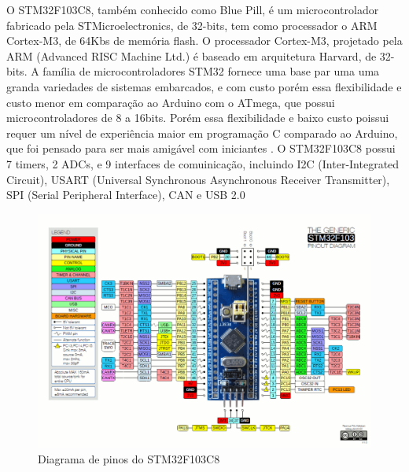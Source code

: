 O STM32F103C8, também conhecido como Blue Pill, é um microcontrolador fabricado pela STMicroelectronics, de 32-bits, tem como processador o ARM Cortex-M3, de 64Kbs de memória flash.
O processador Cortex-M3, projetado pela ARM (Advanced RISC Machine Ltd.) é  baseado em arquitetura Harvard, de 32-bits.
A família de microcontroladores STM32 fornece uma base par uma uma granda variedades de sistemas embarcados,  e com custo porém essa flexibilidade e custo menor em comparação ao Arduino com o ATmega, que possui microcontroladores de 8 a 16bits.
Porém essa flexibilidade e baixo custo poissui requer um nível de experiência maior em programação C comparado ao Arduino, que foi pensado para ser mais amigável com iniciantes \cite{cortex_m3}.
O STM32F103C8 possui 7 timers, 2 ADCs, e 9 interfaces de comuinicação, incluindo I2C (Inter-Integrated Circuit), USART (Universal Synchronous Asynchronous Receiver Transmitter), SPI (Serial Peripheral Interface), CAN e USB 2.0


\begin{figure}[h]
	\centering
	\includegraphics[width=1.0\textwidth]{figures/stm32f1_pinout}
	\caption{Diagrama de pinos do STM32F103C8}
\end{figure}

